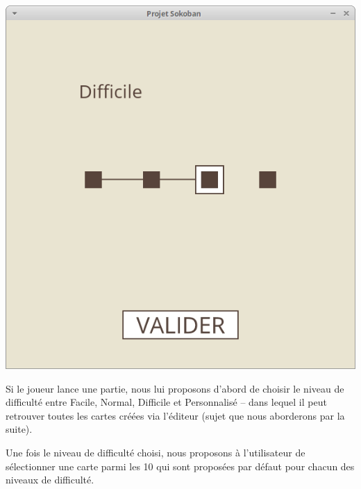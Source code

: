 \documentclass[english,11pt]{report}
\begin{document}
\begin{center} 
\includegraphics[scale=0.4]{difficultes}\par
\end{center}
\par
Si le joueur lance une partie, nous lui proposons d’abord de choisir le niveau de difficulté entre Facile, Normal, Difficile et Personnalisé – dans lequel il peut retrouver toutes les cartes créées via l’éditeur (sujet que nous aborderons par la suite).\par
\vspace{0.2cm}
Une fois le niveau de difficulté choisi, nous proposons à l’utilisateur de sélectionner une carte parmi les 10 qui sont proposées par défaut pour chacun des niveaux de difficulté.\par
\vspace{0.5cm}
\end{document}

